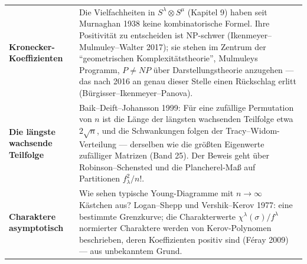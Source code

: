 \begin{forschung}
\begin{center}
{\small
\renewcommand{\arraystretch}{1.45}
\begin{tabular}{@{}P{3.0cm}P{5.2cm}@{}}
\toprule
\textbf{Kronecker-Koeffizienten} & Die Vielfachheiten in $S^{\lambda}\otimes S^{\mu}$ (Kapitel 9) haben seit Murnaghan 1938 keine kombinatorische Formel. Ihre Positivität zu entscheiden ist NP-schwer (Ikenmeyer--Mulmuley--Walter 2017); sie stehen im Zentrum der \enquote{geometrischen Komplexitätstheorie}, Mulmuleys Programm, $P\neq NP$ über Darstellungstheorie anzugehen --- das nach 2016 an genau dieser Stelle einen Rückschlag erlitt (Bürgisser--Ikenmeyer--Panova).\\
\textbf{Die längste wachsende Teilfolge} & Baik--Deift--Johansson 1999: Für eine zufällige Permutation von $n$ ist die Länge der längsten wachsenden Teilfolge etwa $2\sqrt n$, und die Schwankungen folgen der Tracy--Widom-Verteilung --- derselben wie die größten Eigenwerte zufälliger Matrizen (Band 25). Der Beweis geht über Robinson--Schensted und die Plancherel-Maß auf Partitionen $f_\lambda^{2}/n!$.\\
\textbf{Charaktere asymptotisch} & Wie sehen typische Young-Diagramme mit $n\to\infty$ Kästchen aus? Logan--Shepp und Vershik--Kerov 1977: eine bestimmte Grenzkurve; die Charakterwerte $\chi^{\lambda}(\sigma)/f^{\lambda}$ normierter Charaktere werden von Kerov-Polynomen beschrieben, deren Koeffizienten positiv sind (Féray 2009) --- aus unbekanntem Grund.\\
\bottomrule
\end{tabular}}
\end{center}
\end{forschung}

